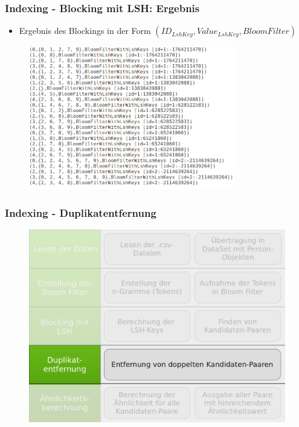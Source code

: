 \documentclass{beamer}
\begin{document}
    \begin{frame}
    		\frametitle{Indexing - Blocking mit LSH: Ergebnis}
    		\begin{itemize}
    			\item Ergebnis des Blockings in der Form $(ID_{LshKey}, Value_{LshKey},
    			 BloomFilter)$
    		\end{itemize}
    		\begin{figure}[H]
    			\includegraphics[width=0.8\textwidth]{graphics/lsh2.png}
    		\end{figure}
    \end{frame}
    
    \begin{frame}
    		\frametitle{Indexing - Duplikatentfernung}
    		\begin{figure}[H]
    			\includegraphics[width=\textwidth]{graphics/process_4.png}
    		\end{figure}
    \end{frame}
    
\end{document}
